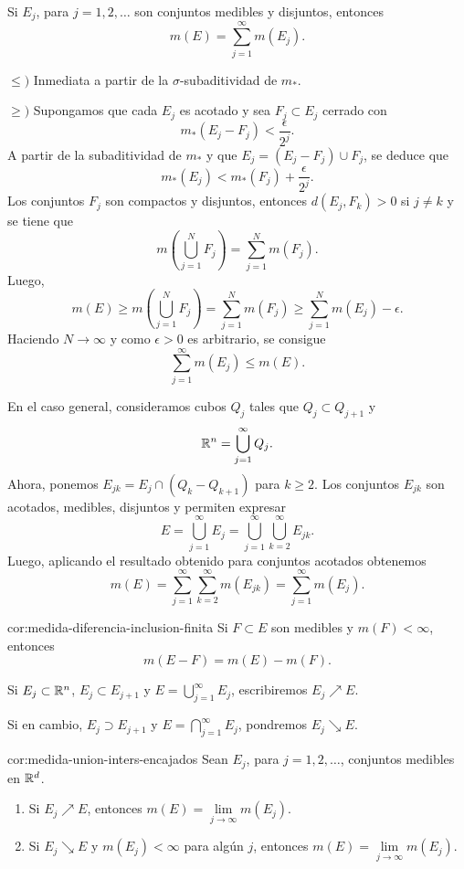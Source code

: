 \begin{teorema}{}
Si $E_j$, para $j=1,2,\ldots$ son conjuntos medibles y disjuntos, entonces
\[
m(E)=\sum\limits_{j=1}^{\infty} m(E_j).
\]
\end{teorema}

\begin{demo}{}
$\leq)$
Inmediata a partir de la $\sigma$-subaditividad de $m_{*}$.

$\geq )$
Supongamos que cada $E_j$ es acotado y sea $F_j\subset E_j$ cerrado con 
\[
m_{*}(E_j-F_j)<\frac{\epsilon}{2^j}.
\]
A partir de la subaditividad de $m_{*}$ y que $E_j=(E_j-F_j)\cup F_j$, se deduce que
\[
m_{*}(E_j)<m_{*}(F_j)+\frac{\epsilon}{2^j}.\]
Los conjuntos $F_j$ son compactos y disjuntos, entonces
$d(E_j,F_k)>0$ si $j\neq k$ y se tiene que
\[
m\left(\bigcup\limits_{j=1}^{N} F_j\right)=
\sum\limits_{j=1}^N m(F_j).
\]
Luego, 
\[
m(E)\geq m\left( \bigcup\limits_{j=1}^N F_j\right)=
\sum\limits_{j=1}^N m(F_j)\geq \sum\limits_{j=1}^N m(E_j)-\epsilon.
\]
Haciendo $N\to \infty$ y como $\epsilon>0$ es arbitrario, se consigue
\[
\sum\limits_{j=1}^{\infty}m(E_j)\leq m(E).
\]

En el caso general, consideramos cubos $Q_j$ tales que $Q_j\subset Q_{j+1}$ y 
\[
\mathbb{R}^n=\bigcup\limits_{j=1}^{\infty} Q_j.
\]
Ahora, ponemos $E_{jk}=E_j\cap (Q_k-Q_{k+1})$ para $k\geq 2$.
Los conjuntos $E_{jk}$ son acotados, medibles, disjuntos y permiten expresar
\[
E=\bigcup\limits_{j=1}^{\infty} E_j=
\bigcup\limits_{j=1}^{\infty} \bigcup\limits_{k=2}^{\infty} E_{jk}.
\]
Luego, aplicando el resultado obtenido para  conjuntos acotados obtenemos
\[
m(E)=\sum\limits_{j=1}^{\infty}\sum\limits_{k=2}^{\infty}m(E_{jk})=
\sum\limits_{j=1}^{\infty} m(E_j).
\]
\end{demo}

\begin{corolario}{cor:medida-diferencia-inclusion-finita}
Si $F\subset E$ son medibles y $m(F)<\infty$, entonces
\[
m(E-F)=m(E)-m(F).
\]
\end{corolario}

\begin{definicion}{}
Si $E_j\subset \mathbb{R}^n$, $E_j\subset E_{j+1}$ y $E=\bigcup\limits_{j=1}^{\infty} E_j$, escribiremos $E_j \nearrow E$.

Si en cambio, $E_j\supset E_{j+1}$ y $E=\bigcap\limits_{j=1}^{\infty} E_j$, pondremos $E_j \searrow E$.
\end{definicion}

\begin{corolario}{cor:medida-union-inters-encajados}
Sean $E_j$, para $j=1,2,\ldots$, conjuntos medibles en $\mathbb{R}^d$. 
\begin{enumerate}
    \item \label{it:medida-union-encajados} Si $E_j\nearrow E$, entonces $m(E)=\lim\limits_{j \to \infty} m(E_j)$.
    \item \label{it:medida-interseccion-encajados} Si $E_j \searrow E$ y $m(E_j)<\infty$ para alg\'un $j$, entonces $m(E)=\lim\limits_{j \to \infty} m(E_j)$.
\end{enumerate}
\end{corolario}

